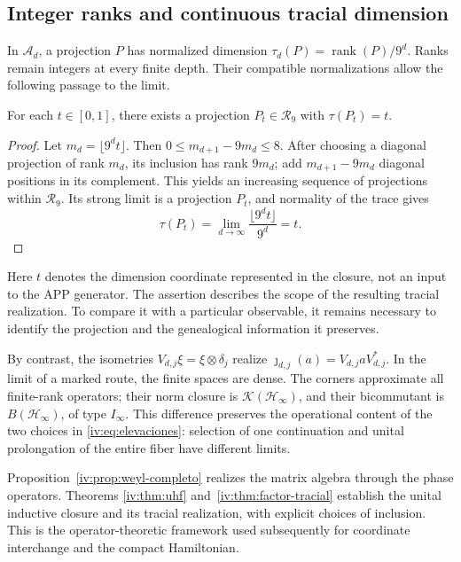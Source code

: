 \subsection{Integer ranks and continuous tracial dimension}

In \(\mathcal A_d\), a projection \(P\) has normalized
dimension \(\tau_d(P)=\operatorname{rank}(P)/9^d\).
Ranks remain integers at every finite depth. Their
compatible normalizations allow the following passage to the limit.

\begin{proposition}
\label{iv:prop:dimension-tracial}
For each \(t\in[0,1]\), there exists a projection
\(P_t\in\mathcal R_9\) with \(\tau(P_t)=t\).
\end{proposition}
\begin{proof}
Let \(m_d=\lfloor9^dt\rfloor\). Then
\(0\leq m_{d+1}-9m_d\leq8\). After choosing a diagonal projection
of rank \(m_d\), its inclusion has rank \(9m_d\);
add \(m_{d+1}-9m_d\) diagonal positions in its complement.
This yields an increasing sequence of projections within
\(\mathcal R_9\). Its strong limit is a projection \(P_t\),
and normality of the trace gives
\[
 \tau(P_t)=\lim_{d\to\infty}\frac{\lfloor9^dt\rfloor}{9^d}=t.
\]
\end{proof}

Here \(t\) denotes the dimension coordinate represented
in the closure, not an input to the APP generator. The assertion
describes the scope of the resulting tracial realization. To
compare it with a particular observable, it remains necessary to
identify the projection and the genealogical information it preserves.

By contrast, the isometries
\(V_{d,j}\xi=\xi\otimes\delta_j\) realize
\(\jmath_{d,j}(a)=V_{d,j}aV_{d,j}^*\). In the limit of a
marked route, the finite spaces are dense. The corners
approximate all finite-rank operators; their norm closure
is \(\mathcal K(\mathcal H_\infty)\), and their bicommutant is
\(B(\mathcal H_\infty)\), of type \(I_\infty\). This
difference preserves the operational content of the two choices
in \eqref{iv:eq:elevaciones}: selection of one continuation and
unital prolongation of the entire fiber have different limits.

Proposition~\ref{iv:prop:weyl-completo} realizes the matrix algebra
through the phase operators. Theorems
\ref{iv:thm:uhf} and~\ref{iv:thm:factor-tracial} establish the unital
inductive closure and its tracial realization, with explicit choices
of inclusion. This is the operator-theoretic framework used subsequently
for coordinate interchange and the compact Hamiltonian.
